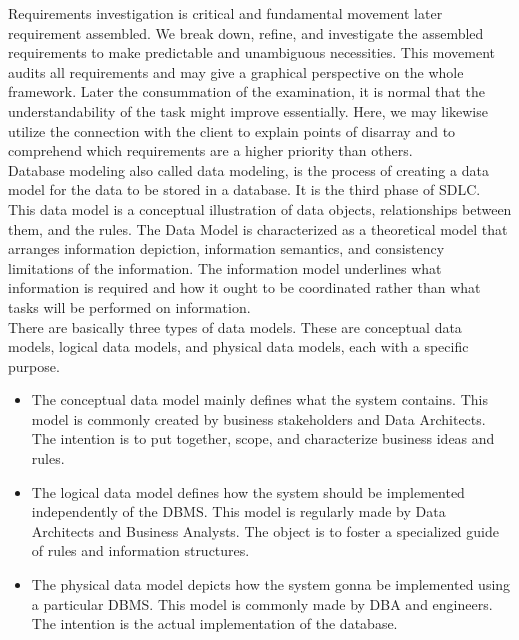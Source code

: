 Requirements investigation is critical and fundamental movement later requirement assembled. We break down, refine, and investigate the assembled requirements to make predictable and unambiguous necessities. This movement audits all requirements and may give a graphical perspective on the whole framework. Later the consummation of the examination, it is normal that the understandability of the task might improve essentially. Here, we may likewise utilize the connection with the client to explain points of disarray and to comprehend which requirements are a higher priority than others.\\

Database modeling also called data modeling, is the process of creating a data model for the data to be stored in a database.  It is the third phase of SDLC. This data model is a conceptual illustration of data objects, relationships between them, and the rules.  The Data Model is characterized as a theoretical model that arranges information depiction, information semantics, and consistency limitations of the information. The information model underlines what information is required and how it ought to be coordinated rather than what tasks will be performed on information.\\

There are basically three types of data models. These are conceptual data models, logical data models, and physical data models,  each with a specific purpose.\\

\begin{itemize}
  \item The conceptual data model mainly defines what the system contains. This model is commonly created by business stakeholders and Data Architects. The intention is to put together, scope, and characterize business ideas and rules.
  \item The logical data model defines how the system should be implemented independently of the DBMS. This model is regularly made by Data Architects and Business Analysts. The object is to foster a specialized guide of rules and information structures.
  \item The physical data model depicts how the system gonna be implemented using a particular DBMS. This model is commonly made by DBA and engineers. The intention is the actual implementation of the database.
\end{itemize}


